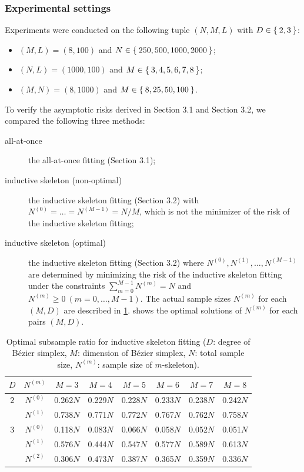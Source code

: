 \documentclass{article}
\begin{document}
\subsubsection{Experimental settings}
Experiments were conducted on the following tuple $(N, M, L)$ with $D \in \Set{2, 3}$:
\begin{itemize}
    \item  $(M, L) = (8, 100)$ and $N \in \Set{250, 500, 1000, 2000}$;
    \item  $(N, L) = (1000, 100)$ and $M \in \Set{3, 4, 5, 6, 7, 8}$;
    \item  $(M, N) = (8, 1000)$ and $ M \in \Set{8, 25, 50, 100}$.
\end{itemize}

To verify the asymptotic risks derived in Section 3.1 and Section 3.2, we compared the following three methods:
\begin{description}
    \item[all-at-once] the all-at-once fitting (Section 3.1);
    \item[inductive skeleton (non-optimal)] the inductive skeleton fitting (Section 3.2) with $N^{(0)} = \dots = N^{(M-1)} = N / M$, which is not the minimizer of the risk of the inductive skeleton fitting;
    \item[inductive skeleton (optimal)] the inductive skeleton fitting (Section 3.2) where $N^{(0)}, N^{(1)}, \dots, N^{(M-1)}$ are determined by minimizing the risk of the inductive skeleton fitting under the constraints $\sum_{m = 0}^{M-1} N^{(m)} = N$ and $N^{(m)}\geq 0~(m = 0, \dots, M-1)$. The actual sample sizes $N^{(m)}$ for each $(M,D)$ are described in \cref{tab:optimal-subsample-ratio}.
     shows the optimal solutions of $N^{(m)}$ for each pairs $(M, D)$.
\end{description}
\begin{table}[ht]
    \centering
    \caption{Optimal subsample ratio for inductive skeleton fitting ($D$: degree of B\'ezier simplex, $M$: dimension of B\'ezier simplex, $N$: total sample size, $N^{(m)}$: sample size of $m$-skeleton).}
    \label{tab:optimal-subsample-ratio}
    \begin{tabular}{cccccccc}
        \toprule
        $D$     &$N^{(m)}$ &$M = 3$  &$M = 4$  &$M = 5$  &$M = 6$  &$M = 7$  &$M = 8$ \\ \midrule
        $2$     &$N^{(0)}$ &0.262$N$ &0.229$N$ &0.228$N$ &0.233$N$ &0.238$N$ &0.242$N$\\ 
                &$N^{(1)}$ &0.738$N$ &0.771$N$ &0.772$N$ &0.767$N$ &0.762$N$ &0.758$N$\\  \hline
        $3$     &$N^{(0)}$ &0.118$N$ &0.083$N$ &0.066$N$ &0.058$N$ &0.052$N$ &0.051$N$\\
                &$N^{(1)}$ &0.576$N$ &0.444$N$ &0.547$N$ &0.577$N$ &0.589$N$ &0.613$N$\\ 
                &$N^{(2)}$ &0.306$N$ &0.473$N$ &0.387$N$ &0.365$N$ &0.359$N$ &0.336$N$\\ 
        \bottomrule
    \end{tabular}
\end{table}
\end{document}
